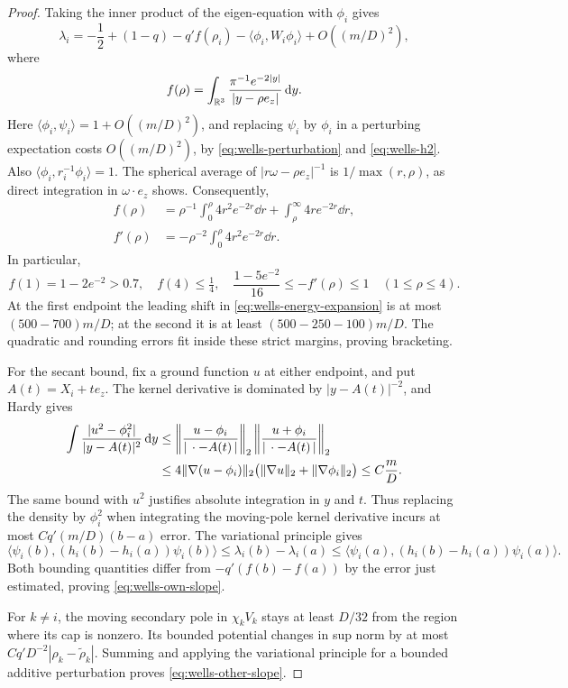 \begin{proof}
Taking the inner product of the eigen-equation with \(\phi_i\) gives
\begin{equation}
 \lambda_i=-\frac12+(1-q)-q'f(\rho_i)
       -\langle\phi_i,W_i\phi_i\rangle+O((m/D)^2),
 \label{eq:wells-energy-expansion}
\end{equation}
where
\[
 f(\rho)=\int_{\mathbb R^3}\frac{\pi^{-1}e^{-2|y|}}{|y-\rho e_z|}\,\mathrm d y.
\]
Here \(\langle\phi_i,\psi_i\rangle=1+O((m/D)^2)\), and replacing
\(\psi_i\) by \(\phi_i\) in a perturbing expectation costs \(O((m/D)^2)\),
by \eqref{eq:wells-perturbation} and \eqref{eq:wells-h2}.
Also \(\langle\phi_i,r_i^{-1}\phi_i\rangle=1\).
The spherical average of \(|r\omega-\rho e_z|^{-1}\) is
\(1/\max(r,\rho)\), as direct integration in \(\omega\cdot e_z\) shows.
Consequently,
\begin{align}
 f(\rho)&=\rho^{-1}\int_0^\rho4r^2e^{-2r}\dd r
             +\int_\rho^\infty4r e^{-2r}\dd r,
 \label{eq:wells-radial-potential}\\
 f'(\rho)&=-\rho^{-2}\int_0^\rho4r^2e^{-2r}\dd r.
 \label{eq:wells-f-derivative}
\end{align}
In particular,
\[
 f(1)=1-2e^{-2}>0.7,\quad f(4)\le\tfrac14,\quad
 \frac{1-5e^{-2}}{16}\le-f'(\rho)\le1\quad(1\le\rho\le4).
\]
At the first endpoint the leading shift in
\eqref{eq:wells-energy-expansion} is at most \((500-700)m/D\);
at the second it is at least \((500-250-100)m/D\).
The quadratic and rounding errors fit inside these strict margins,
proving bracketing.

For the secant bound, fix a ground function \(u\) at either endpoint,
and put \(A(t)=X_i+t e_z\). The kernel derivative is dominated by
\(|y-A(t)|^{-2}\), and Hardy gives
\begin{align}
 \int\frac{|u^2-\phi_i^2|}{|y-A(t)|^2}\,\mathrm d y
 &\le\left\|\frac{u-\phi_i}{|\,\cdot-A(t)\,|}\right\|_2
       \left\|\frac{u+\phi_i}{|\,\cdot-A(t)\,|}\right\|_2 \notag\\
 &\le4\|\nabla(u-\phi_i)\|_2
       \bigl(\|\nabla u\|_2+\|\nabla\phi_i\|_2\bigr)
 \le C\frac mD.
 \label{eq:wells-density-hardy}
\end{align}
The same bound with \(u^2\) justifies absolute integration in \(y\)
and \(t\). Thus replacing the density by \(\phi_i^2\) when integrating
the moving-pole kernel derivative incurs at most
\(Cq'(m/D)(b-a)\) error.
The variational principle gives
\[
 \langle\psi_i(b),(h_i(b)-h_i(a))\psi_i(b)\rangle
 \le\lambda_i(b)-\lambda_i(a)
 \le\langle\psi_i(a),(h_i(b)-h_i(a))\psi_i(a)\rangle.
\]
Both bounding quantities differ from \(-q'(f(b)-f(a))\) by the error
just estimated, proving \eqref{eq:wells-own-slope}.

For \(k\ne i\), the moving secondary pole in \(\chi_kV_k\) stays at
least \(D/32\) from the region where its cap is nonzero.
Its bounded potential changes in sup norm by at most
\(Cq'D^{-2}|\rho_k-\widetilde\rho_k|\).
Summing and applying the variational principle for a bounded additive
perturbation proves \eqref{eq:wells-other-slope}.
\end{proof}

